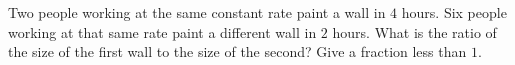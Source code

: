 Two people working at the same constant rate paint a wall in \(4\) hours. Six people working at that same rate paint a different wall in \(2\) hours. What is the ratio of the size of the first wall to the size of the second? Give a fraction less than \(1\).
